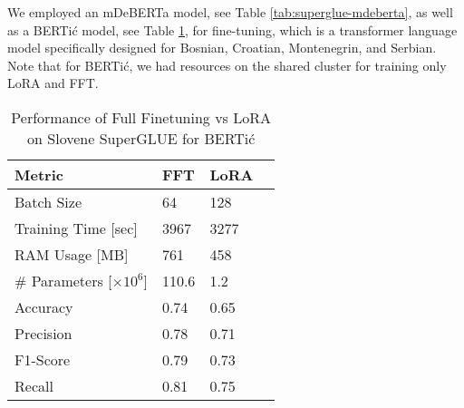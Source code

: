 We employed an mDeBERTa model, see Table \ref{tab:superglue-mdeberta}, as well as a BERTić \cite{ljubesic2021bertic} model, see Table \ref{tab:superglue-bertic}, for fine-tuning, which is a transformer language model specifically designed for Bosnian, Croatian, Montenegrin, and Serbian. Note that for BERTić, we had resources on the shared cluster for training only LoRA and FFT.

\begin{table}[htbp]
  \centering
  \label{tab:comparison}
    \caption{Performance of Full Finetuning vs PEFT methods on Slovene SuperGLUE for mDeBERTa-base}
    \label{tab:superglue-mdeberta}
\end{table}

\begin{table}[htbp]
  \centering
  \begin{tabularx}{\columnwidth}{@{} l *{3}{X} @{}}
    \toprule
    \textbf{Metric} & \textbf{FFT} & \textbf{LoRA} \\ \midrule
    Batch Size & 64 & 128\\
    Training Time [sec] & 3967 & 3277\\
    RAM Usage [MB] & 761 & 458\\
    \# Parameters [$\times 10^6$] & 110.6 & 1.2\\
    Accuracy & 0.74 & 0.65\\
    Precision & 0.78 & 0.71\\
    F1-Score & 0.79 & 0.73\\
    Recall & 0.81 & 0.75\\
    \bottomrule
  \end{tabularx}
  \caption{Performance of Full Finetuning vs LoRA on Slovene SuperGLUE for BERTić}
  \label{tab:superglue-bertic}
\end{table}


